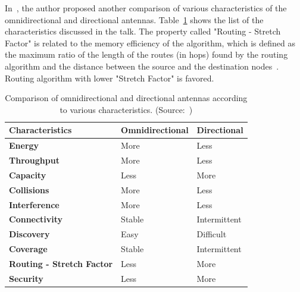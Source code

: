 \documentclass[12pt, oneandhalf, chaparabic, sees, ms]{metu}
\begin{document}
In~\cite{kranakis2012}, the author proposed another comparison of various characteristics of the omnidirectional and directional antennas.
Table~\ref{tab:omni-dir2} shows the list of the characteristics discussed in the talk.
The property called "Routing - Stretch Factor" is related to the memory efficiency of the algorithm, which is defined as the maximum ratio 
of the length of the routes (in hops) found by the routing algorithm and the distance between the source and the destination nodes~\cite{gavoille2001}.
Routing algorithm with lower "Stretch Factor" is favored.

\vspace{2cm}

\renewcommand{\arraystretch}{1.2}%
\begin{table}[H]
\begin{center}
\caption{Comparison of omnidirectional and directional antennas according to various characteristics. (Source:~\protect\cite[p.~14]{kranakis2012})}
\label{tab:omni-dir2}
\begin{adjustbox}{max width=\textwidth}
\begin{tabular}{| >{\centering\bfseries}m{1.1in} || >{\centering}m{1.2in} | >{\centering}m{1in} |}
\hline
\rowcolor{lightgray}
\textbf{Characteristics} & \textbf{Omnidirectional} & \textbf{Directional}  \tabularnewline
\hline \hline 
\cellcolor{lightgray} Energy         &   More   &   Less             \tabularnewline \hline
\cellcolor{lightgray} Throughput     &   More   &   Less             \tabularnewline \hline
\cellcolor{lightgray} Capacity       &   Less   &   More             \tabularnewline \hline
\cellcolor{lightgray} Collisions     &   More   &   Less             \tabularnewline \hline
\cellcolor{lightgray} Interference   &   More   &   Less             \tabularnewline \hline
\cellcolor{lightgray} Connectivity   &   Stable &   Intermittent     \tabularnewline \hline
\cellcolor{lightgray} Discovery      &   Easy   &   Difficult        \tabularnewline \hline
\cellcolor{lightgray} Coverage       &   Stable &   Intermittent     \tabularnewline \hline
\cellcolor{lightgray} Routing - Stretch Factor &  Less  &  More        \tabularnewline \hline
\cellcolor{lightgray} Security       &  Less   &   More              \tabularnewline \hline
\end{tabular}
\end{adjustbox}
\end{center}
\end{table}
\renewcommand{\arraystretch}{1}%
\end{document}
